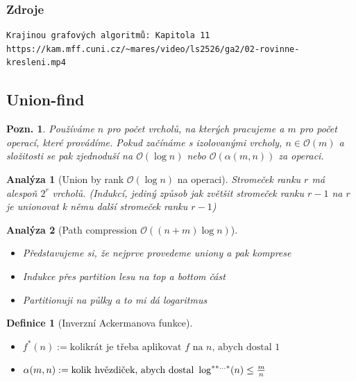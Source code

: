 \documentclass{article}
\theoremstyle{noparens}
\newtheorem*{anal}{Analýza}
\newtheorem*{definition}{Definice}
\theoremstyle{noparens-mys}
\theoremstyle{noparens-note}
\newtheorem*{note}{Pozn.}
\newcommand{\OO}{\mathcal{O}}
\begin{document}
\subsubsection*{Zdroje}

\begin{verbatim}
Krajinou grafových algoritmů: Kapitola 11
https://kam.mff.cuni.cz/~mares/video/ls2526/ga2/02-rovinne-kresleni.mp4
\end{verbatim}


\subsection{Union-find}

\begin{note}
    Používáme $n$ pro počet vrcholů, na kterých pracujeme a $m$ pro počet operací,
    které provádíme.  Pokud začínáme s izolovanými vrcholy, $n \in \OO(m)$ a
    složitosti se pak zjednoduší na $\OO(\log n)$ nebo $\OO(\alpha(m, n))$ za
    operaci.
\end{note}

\begin{anal}[Union by rank $\OO(\log n)$ na operaci]
    Stromeček ranku $r$ má alespoň $2^r$ vrcholů. (Indukcí, jediný způsob jak
    zvětšit stromeček ranku $r-1$ na $r$ je unionovat k němu další stromeček
    ranku $r-1$)
\end{anal}

\begin{anal}[Path compression $\OO((n + m) \log n)$]
    ~

    \begin{itemize}
        \item Představujeme si, že nejprve provedeme uniony a pak komprese
        \item Indukce přes partition lesu na top a bottom část
        \item Partitionuji na půlky a to mi dá logaritmus
    \end{itemize}
\end{anal}

\begin{definition}[Inverzní Ackermanova funkce]
    ~

    \begin{itemize}
        \item $f^*(n) := \text{kolikrát je třeba aplikovat } f \text{ na }
            n\text{, abych dostal } 1$
        \item $\alpha(m, n) := \text{kolik hvězdiček, abych dostal }
            \log^{**\hdots*}(n) \le {m \over n}$
    \end{itemize}
\end{definition}
\end{document}
